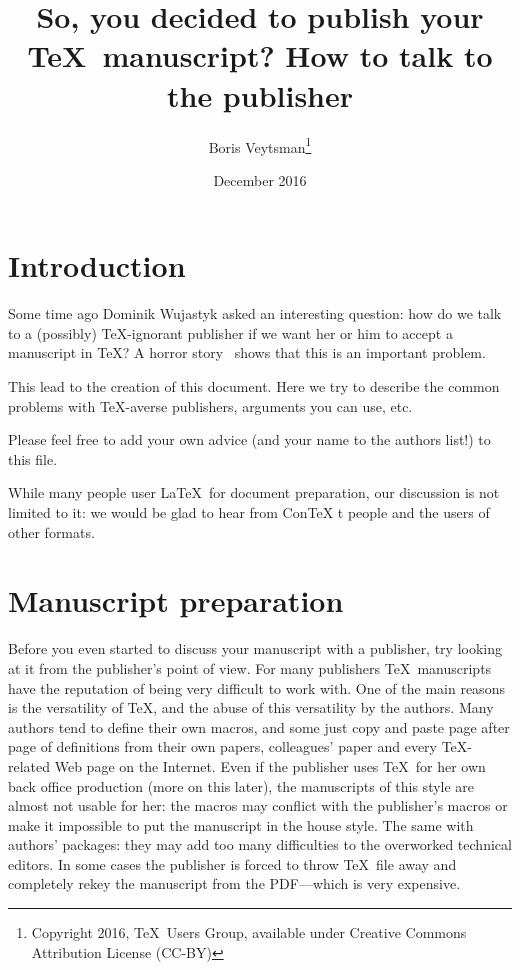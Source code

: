 \documentclass{article}
\begin{document}
\title{So, you decided to publish your \TeX\ manuscript?  How to talk
  to the publisher}
\author{Boris Veytsman\thanks{Copyright 2016, \TeX\ Users Group,
    available under Creative Commons Attribution License (CC-BY)}}
\date{December 2016}
\maketitle

\section{Introduction}
\label{sec:intro}

Some time ago Dominik Wujastyk asked an interesting question: how do
we talk to a (possibly) \TeX-ignorant publisher if we want her or him
to accept a manuscript in \TeX?  A horror story~\cite{Verna13} shows
that this is an important problem.

This lead to the creation of this document.  Here we try to describe
the common problems with \TeX-averse publishers, arguments you can
use, etc.


Please feel free to add your own advice (and your name to the authors
list!) to this file.  

While many people user \LaTeX\ for document preparation, our
discussion is not limited to it: we would be glad to hear from Con\TeX
t people and the users of other formats.  


\section{Manuscript preparation}
\label{sec:preparation}

Before you even started to discuss your manuscript with a publisher,
try looking at it from the publisher's point of view.  For many
publishers \TeX\ manuscripts have the reputation of being very
difficult to work with.  One of the main reasons is the versatility of
\TeX, and the abuse of this versatility by the authors.  Many authors
tend to define their own macros, and some just copy and paste page
after page of definitions from their own papers, colleagues' paper and
every \TeX-related Web page on the Internet.  Even if the publisher
uses \TeX\ for her own back office production (more on this later),
the manuscripts of this style are almost not usable for her: the
macros may conflict with the publisher's macros or make it impossible
to put the manuscript in the house style.  The same with authors'
packages: they may add too many difficulties to the overworked
technical editors.  In some cases the publisher is forced to throw
\TeX\ file away and completely rekey the manuscript from the
PDF---which is very expensive.
\end{document}
